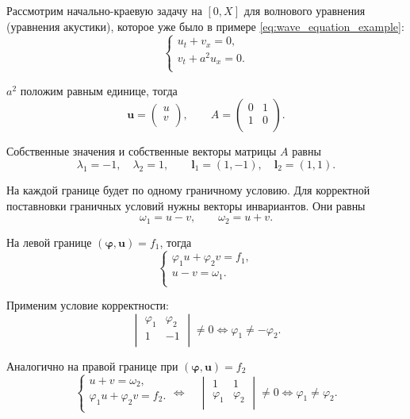 \documentclass[../main.tex]{subfile}
\begin{document}
\begin{example}
	Рассмотрим начально-краевую задачу на $[0,X]$ для волнового уравнения
	(уравнения акустики), которое уже было в примере
	\eqref{eq:wave_equation_example}:
	\[\begin{cases}
		u_t+v_x=0, \\
		v_t+a^2u_x=0. \\
	\end{cases}\]

	$a^2$ положим равным единице, тогда
	\[\boldsymbol{u}=
		\begin{pmatrix}
			u \\
			v \\
		\end{pmatrix},
	\qquad
	A=
		\begin{pmatrix}
			0 & 1 \\
			1 & 0 \\
		\end{pmatrix}.
	\]

	Собственные значения и собственные векторы матрицы $A$ равны
	\[\lambda_1=-1,\quad \lambda_2=1,\qquad
	\boldsymbol{l}_1=(1,-1),\quad \boldsymbol{l}_2=(1,1).\]

	На каждой границе будет по одному граничному условию. Для корректной
	поставновки граничных условий нужны векторы инвариантов. Они равны
	\[\omega_1=u-v,\qquad \omega_2=u+v.\]

	На левой границе $(\boldsymbol\varphi,\boldsymbol u)=f_1$, тогда
	\[
		\begin{cases}
			\varphi_1 u+\varphi_2 v=f_1, \\
			u-v=\omega_1. \\
		\end{cases}
	\]

	Применим условие корректности:
	\[
		\begin{vmatrix}
			\varphi_1 & \varphi_2 \\
			1	& -1	\\
		\end{vmatrix}
		\ne 0\Leftrightarrow
		\varphi_1\ne -\varphi_2.
	\]

	Аналогично на правой границе при $(\boldsymbol\varphi,\boldsymbol u)=
	f_2$
	\[
		\begin{cases}
			u+v=\omega_2, \\
			\varphi_1 u+\varphi_2 v=f_2. \\
		\end{cases}
		\Leftrightarrow\quad
		\begin{vmatrix}
			1	& 1	\\
			\varphi_1 & \varphi_2 \\
		\end{vmatrix}
		\ne 0\Leftrightarrow
		\varphi_1\ne \varphi_2.
	\]
\end{example}
\end{document}
